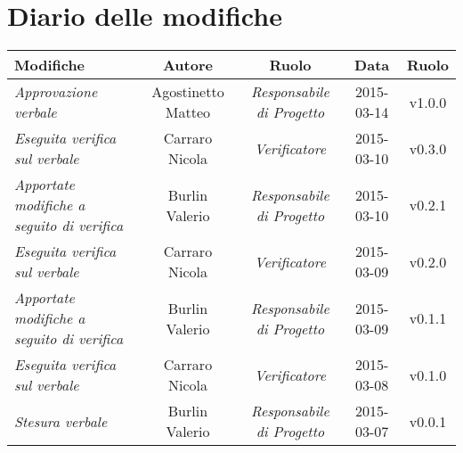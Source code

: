 \newpage
\section*{Diario delle modifiche}

\begin{table}[h]
\centering
\begin{tabular}{|p{}|c|c|c|c|}
	\toprule
		\textbf{Modifiche} & \textbf{Autore} & \textbf{Ruolo} & \textbf{Data} & \textbf{Ruolo} \\
	\midrule
	\midrule
		\textit{Approvazione verbale} & Agostinetto Matteo & \textit{Responsabile di Progetto} & 2015-03-14 & v1.0.0 \\
	\midrule
		\textit{Eseguita verifica sul verbale} & Carraro Nicola & \textit{Verificatore} & 2015-03-10 & v0.3.0 \\ 										
	\midrule
		\textit{Apportate modifiche a seguito di verifica} & Burlin Valerio & \textit{Responsabile di Progetto} & 2015-03-10 & v0.2.1 \\
	\midrule
		\textit{Eseguita verifica sul verbale} & Carraro Nicola & \textit{Verificatore} & 2015-03-09 & v0.2.0 \\
	\midrule
		\textit{Apportate modifiche a seguito di verifica} & Burlin Valerio & \textit{Responsabile di Progetto} & 2015-03-09 & v0.1.1 \\
	\midrule
		\textit{Eseguita verifica sul verbale} & Carraro Nicola & \textit{Verificatore} & 2015-03-08 & v0.1.0 \\
	\midrule
		\textit{Stesura verbale} & Burlin Valerio & \textit{Responsabile di Progetto} & 2015-03-07 & v0.0.1 \\
	\bottomrule
\end{tabular}	
\end{table}

\newpage